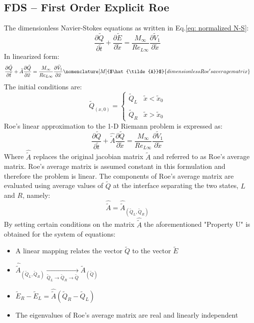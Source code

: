 \documentclass[11pt, a4paper]{article}
\newcommand{\parder}[2]{\frac{\partial {#1}}{\partial {#2}}}
\begin{document}
\subsection{FDS -- First Order Explicit Roe}
The dimensionless Navier-Stokes equations as written in Eq.\ref{eq: normalized N-S}:
\begin{equation}
    \parder{\tilde{Q}}{\tilde{t}}+\parder{\tilde{E}}{\tilde{x}}=\frac{M_\infty}{Re_{L\infty}}\parder{\tilde{V}_1}{\tilde{x}}
\end{equation}
In linearized form:
\begin{equation}
    \parder{\tilde{Q}}{\tilde{t}}+\tilde{A}\parder{\tilde{Q}}{\tilde{x}}=\frac{M_\infty}{Re_{L\infty}}\parder{\tilde{V}_1}{\tilde{x}}
    \nomenclature[M]{$\hat{\tilde{A}}$}{dimensionless Roe's average matrix}
\end{equation}
The initial conditions are:
\begin{equation*}
    \tilde{Q}_{\left(x,0\right)}=\left\{\begin{array}{lr}
        \tilde{Q}_L & \tilde{x}<\tilde{x}_0 \\\\
        \tilde{Q}_R & \tilde{x}>\tilde{x}_0
    \end{array}\right.
\end{equation*}
Roe's linear approximation to the 1-D Riemann problem is expressed as:
\begin{equation}
    \parder{\tilde{Q}}{\tilde{t}}+\hat{\tilde{A}}\parder{\tilde{Q}}{\tilde{x}}=\frac{M_\infty}{Re_{L\infty}}\parder{\tilde{V}_1}{\tilde{x}}
\end{equation}
Where $\hat{\tilde{A}}$ replaces the original jacobian matrix $\tilde{A}$ and referred to as Roe's average matrix. Roe's average matrix is assumed constant in this formulation and therefore the problem is linear. The components of Roe's average matrix are evaluated using average values of $\tilde{Q}$ at the interface separating the two states, $L$ and $R$, namely: $$\hat{\tilde{A}}=\hat{\tilde{A}}_{\left(\tilde{Q}_L,\tilde{Q}_R\right)}$$ By setting certain conditions on the matrix $\hat{\tilde{A}}$ the aforementioned "Property U" is obtained for the system of equations:
\begin{itemize}
    \item A linear mapping relates the vector $\tilde{Q}$ to the vector $\tilde{E}$
    \item $\hat{\tilde{A}}_{\left(\tilde{Q}_L,\tilde{Q}_R\right)}\xrightarrow[\tilde{Q}_L\rightarrow\tilde{Q}_R\rightarrow\tilde{Q}]{}\tilde{A}_{\left(\tilde{Q}\right)}$
    \item $\tilde{E}_R-\tilde{E}_L=\hat{\tilde{A}}\left(\tilde{Q}_R-\tilde{Q}_L\right)$
    \item The eigenvalues of Roe's average matrix are real and linearly independent
\end{itemize}
\end{document}
